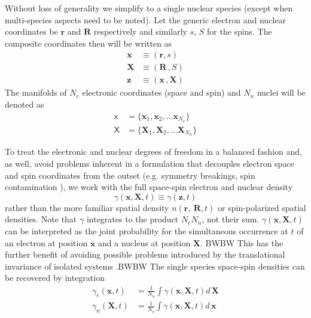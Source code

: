 \documentclass[aps,preprint]{revtex4}%
\begin{document}
Without loss of generality we simplify to a single nuclear species (except
when multi-species aspects need to be noted). Let the generic electron and
nuclear coordinates be $\mathbf{r}$ and $\mathbf{R}$ respectively and
similarly $s$, $S$ for the spins. The composite coordinates then will be
written as
\begin{align}
\mathbf{x}  &  \equiv(\mathbf{r},s)\nonumber\\
\mathbf{X}  &  \equiv(\mathbf{R}\,,S)\nonumber\\
\mathbf{z}  &  \equiv(\mathbf{x}\,,\mathbf{X})
\end{align}
The manifolds of $N_{e}$ electronic coordinates (space and spin) and $N_{n}$
nuclei will be denoted as
\begin{align}
\mathsf{x}  &  =\{\mathbf{x}_{1},\mathbf{x}_{2},\ldots\mathbf{x}_{N_{e}%
}\}\nonumber\\
\mathsf{X}  &  =\{\mathbf{X}_{1},\mathbf{X}_{2},\ldots\mathbf{X}_{N_{n}}\}
\label{manifdef}%
\end{align}


To treat the electronic and nuclear degrees of freedom in a balanced fashion
and, as well, avoid problems inherent in a formulation that decouples electron
space and spin coordinates from the outset (e.g. symmetry breakings, spin
contamination \cite{PerdewSavin,BLWSBT98,SavinSem2}), we work with the full
space-spin electron and nuclear density
\begin{equation}
\gamma(\mathbf{x},\mathbf{X},t)\equiv\gamma(\mathbf{z},t) \label{gammadef}%
\end{equation}
rather than the more familiar spatial density $n(\mathbf{r},\mathbf{\ R},t)$
or spin-polarized spatial densities. Note that $\gamma$ integrates to the
product $N_{e}N_{n}$, not their sum. $\gamma(\mathbf{x},\mathbf{X},t)$ can be
interpreted as the joint probability for the simultaneous occurrence at $t$ of
an electron at position $\mathbf{x}$ and a nucleus at position $\mathbf{X}$.
BWBW This has the further benefit of avoiding possible problems introduced by
the translational invariance of isolated systems \cite{KreibGross}.BWBW The
single species space-spin densities can be recovered by integration
\begin{align}
\gamma_{e}(\mathbf{x},t)  &  =\frac{1}{N_{n}}\int\gamma(\mathbf{x}%
,\mathbf{X},t)d\,\mathbf{X}\nonumber\\
\gamma_{n}(\mathbf{X},t)  &  =\frac{1}{N_{e}}\int\gamma(\mathbf{x}%
,\mathbf{X},t)d\,\mathbf{x}%
\end{align}
\end{document}
